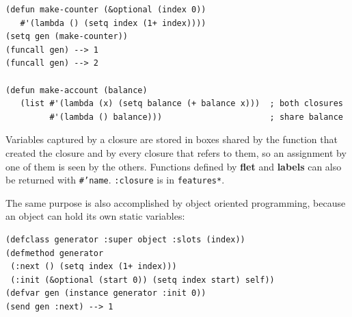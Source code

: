 \begin{verbatim}
(defun make-counter (&optional (index 0))
   #'(lambda () (setq index (1+ index))))
(setq gen (make-counter))
(funcall gen) --> 1
(funcall gen) --> 2

(defun make-account (balance)
   (list #'(lambda (x) (setq balance (+ balance x)))  ; both closures
         #'(lambda () balance)))                      ; share balance
\end{verbatim}

Variables captured by a closure are stored in boxes shared by the function
that created the closure and by every closure that refers to them, so an
assignment by one of them is seen by the others.  Functions defined by
{\bf flet} and {\bf labels} can also be returned with {\tt \#'name}.
{\tt :closure} is in {\tt *features*}.

The same purpose is also accomplished by object oriented programming,
because an object can hold its own static variables:
\begin{verbatim}
(defclass generator :super object :slots (index))
(defmethod generator
 (:next () (setq index (1+ index)))
 (:init (&optional (start 0)) (setq index start) self))
(defvar gen (instance generator :init 0))
(send gen :next) --> 1
\end{verbatim}


\newpage

